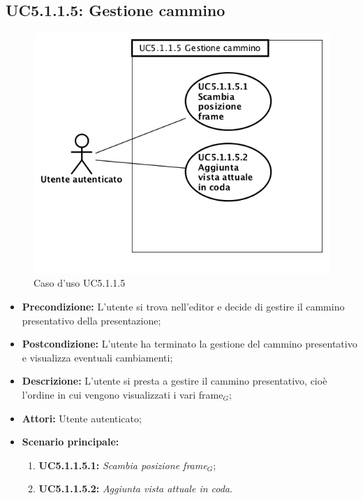 \newpage
\subsection{ UC5.1.1.5: Gestione cammino}

\begin{figure}[h]
	\begin{center}
	\includegraphics[scale=0.4]{diagram/UC5-1-1-5.png}
	\caption{Caso d'uso UC5.1.1.5}
	\end{center}
\end{figure}
\begin{itemize}
	\item \textbf{Precondizione:} L’utente si trova nell’editor e decide di gestire il cammino presentativo della presentazione;
	\item \textbf{Postcondizione:} L’utente ha terminato la gestione del cammino presentativo e visualizza eventuali cambiamenti;
	\item \textbf{Descrizione:} L’utente si presta a gestire il cammino presentativo, cioè l’ordine in cui vengono visualizzati i vari frame$_G$;
	\item \textbf{Attori:} Utente autenticato;
	\item \textbf{Scenario principale:}
	\begin{enumerate}
		\item \textbf{ UC5.1.1.5.1:} \textit{ Scambia posizione frame$_G$};
		\item \textbf{ UC5.1.1.5.2:} \textit{ Aggiunta vista attuale in coda}.
	\end{enumerate}
\end{itemize}
